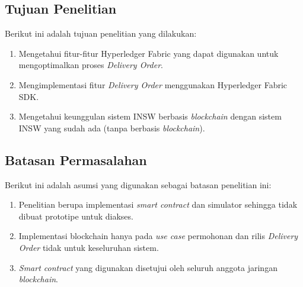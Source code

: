 \subsection{Tujuan Penelitian}
\label{sec:tujuan}
Berikut ini adalah tujuan penelitian yang dilakukan:
\begin{enumerate}
	\item Mengetahui fitur-fitur Hyperledger Fabric yang dapat digunakan untuk mengoptimalkan proses \textit{Delivery Order}.
	\item Mengimplementasi fitur \textit{Delivery Order} menggunakan Hyperledger Fabric SDK.
	\item Mengetahui keunggulan sistem INSW berbasis \textit{blockchain} dengan sistem INSW yang sudah ada (tanpa berbasis \textit{blockchain}).
\end{enumerate}


\subsection{Batasan Permasalahan}
\label{sec:batasanMasalah}
Berikut ini adalah asumsi yang digunakan sebagai batasan penelitian ini:
\begin{enumerate}
	\item Penelitian berupa implementasi \textit{smart contract} dan simulator sehingga tidak dibuat prototipe untuk diakses.
	\item Implementasi blockchain hanya pada \textit{use case} permohonan dan rilis \textit{Delivery Order} tidak untuk keseluruhan sistem.
	\item \textit{Smart contract} yang digunakan disetujui oleh seluruh anggota jaringan \textit{blockchain}.

\end{enumerate}


